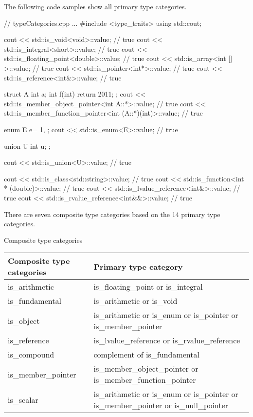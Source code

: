 The following code samples show all primary type categories.


\begin{cpp}
// typeCategories.cpp
...
#include <type_traits>
using std::cout;

cout << std::is_void<void>::value; // true
cout << std::is_integral<short>::value; // true
cout << std::is_floating_point<double>::value; // true
cout << std::is_array<int [] >::value; // true
cout << std::is_pointer<int*>::value; // true
cout << std::is_reference<int&>::value; // true

struct A{
	int a;
	int f(int){ return 2011; }
};
cout << std::is_member_object_pointer<int A::*>::value; // true
cout << std::is_member_function_pointer<int (A::*)(int)>::value; // true

enum E{
	e= 1,
};
cout << std::is_enum<E>::value; // true

union U{
	int u;
};

cout << std::is_union<U>::value; // true

cout << std::is_class<std::string>::value; // true
cout << std::is_function<int * (double)>::value; // true
cout << std::is_lvalue_reference<int&>::value; // true
cout << std::is_rvalue_reference<int&&>::value; // true
\end{cpp}


There are seven composite type categories based on the 14 primary type categories.

\begin{center}
Composite type categories
\end{center}

\begin{longtable}[c]{ll}
\textbf{Composite type categories} & \textbf{Primary type category}                 \\
\endfirsthead
%
\endhead
%
is\_arithmetic                     & is\_floating\_point or is\_integral            \\
is\_fundamental                    & is\_arithmetic or is\_void                     \\
is\_object          & is\_arithmetic or is\_enum or is\_pointer or is\_member\_pointer                      \\
is\_reference                      & is\_lvalue\_reference or is\_rvalue\_reference \\
is\_compound                       & complement of is\_fundamental                  \\
is\_member\_pointer & is\_member\_object\_pointer or is\_member\_function\_pointer                          \\
is\_scalar          & is\_arithmetic or is\_enum or is\_pointer or is\_member\_pointer or is\_null\_pointer
\end{longtable}

